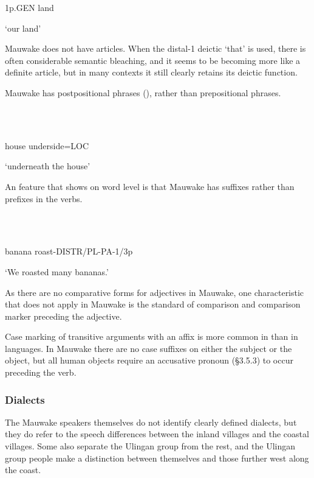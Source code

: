 1p.GEN  land

`our land'

Mauwake does not have articles. When the distal-1 deictic  `that' is used,  there is often considerable semantic bleaching, and it seems to be becoming more like a definite article, but in many contexts it still clearly retains its deictic function.  

Mauwake has postpositional phrases (), rather than prepositional phrases.

\ea%
\label{ex:x681}
\gll {} \\
      \\
\glt
\z

house  underside=LOC

`underneath the house'

An  feature that shows on word level is that Mauwake has suffixes rather than prefixes in the verbs.

\ea%
\label{ex:x682}
\gll {} \\
      \\
\glt
\z

banana  roast-DISTR/PL-PA-1/3p

`We roasted many bananas.'

As there are no comparative forms for adjectives in Mauwake, one characteristic that does not apply in Mauwake is the standard of comparison and comparison marker preceding the adjective. 

Case marking of transitive arguments with an affix is more common in  than in  languages.  In Mauwake there are no case suffixes on either the subject or the object, but all human objects require an accusative pronoun ({\S}3.5.3) to occur preceding the verb.

\subsubsection{Dialects}\footnotemark{}
\hypertarget{RefHeading18661935131865}{}
The Mauwake speakers themselves do not identify clearly defined dialects, but they do refer to the speech differences between the inland villages and the coastal villages. Some also separate the Ulingan group from the rest, and the Ulingan group people make a distinction between themselves and those further west along the coast.

